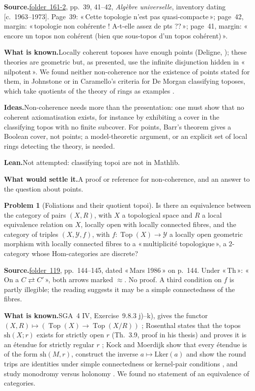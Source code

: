 \documentclass[11pt]{article}
\newcommand{\q}[1]{«\,#1\,»}
\newcommand{\fac}[1]{\href{https://grothendieck.umontpellier.fr/#1.pdf}{folder~#1}}
\newcommand{\Top}{\operatorname{Top}}
\theoremstyle{definition}
\newtheorem{problem}{Problem}
\theoremstyle{plain}\newtheorem*{proposition}{Proposition}\theoremstyle{definition}
\newcommand{\entry}[1]{\par\medskip\noindent\textbf{#1}\enspace}
\newcommand{\src}[1]{\entry{Source.}#1}
\newcommand{\known}{\entry{What is known.}}
\newcommand{\ideas}{\entry{Ideas.}}
\newcommand{\leanst}{\entry{Lean.}}
\newcommand{\settle}{\entry{What would settle it.}}
\begin{document}
\src{\fac{161-2}, pp.~39, 41--42, \emph{Algèbre universelle}, inventory dating [c.~1963--1973]. Page~39: \q{Cette topologie n'est pas quasi-compacte}; page~42, margin: \q{topologie non cohérente ! A-t-elle assez de pts ??}; page~41, margin: \q{encore un topos non cohérent (bien que sous-topos d'un topos cohérent)}.}

\known Locally coherent toposes have enough points (Deligne, \cite[VI, 9.0]{sga4}); these theories are geometric but, as presented, use the infinite disjunction hidden in \q{nilpotent}. We found neither non-coherence nor the existence of points stated for them, in Johnstone \cite{elephant} or in Caramello's criteria for De Morgan classifying toposes, which take quotients of the theory of rings as examples \cite[\S5]{caramello}.

\ideas Non-coherence needs more than the presentation: one must show that no coherent axiomatisation exists, for instance by exhibiting a cover in the classifying topos with no finite subcover. For points, Barr's theorem gives a Boolean cover, not points; a model-theoretic argument, or an explicit set of local rings detecting the theory, is needed.

\leanst Not attempted: classifying topoi are not in Mathlib.

\settle A proof or reference for non-coherence, and an answer to the question about points.

\begin{problem}[Foliations and their quotient topoi]\label{p:fol}
Is there an equivalence between the category of pairs $(X, R)$, with $X$ a topological space and $R$ a local equivalence relation on $X$, locally open with locally connected fibres, and the category of triples $(X, \mathcal Y, f)$, with $f : \Top(X) \to \mathcal Y$ a locally open geometric morphism with locally connected fibres to a \q{multiplicité topologique}, a $2$-category whose Hom-categories are discrete?
\end{problem}

\src{\fac{119}, pp.~144--145, dated \q{Mars 1986} on p.~144. Under \q{Th}: \q{On a $C \rightleftarrows C'$}, both arrows marked $\approx$. No proof. A third condition on $f$ is partly illegible; the reading suggests it may be a simple connectedness of the fibres.}

\known SGA~4 IV, Exercise~9.8.3 j)--k), gives the functor $(X, R) \mapsto (\Top(X) \to \Top(X/R))$ \cite{sga4}; Rosenthal states that the topos $\mathrm{sh}(X; r)$ exists for strictly open $r$ (Th.~3.9, proof in his thesis) and proves it is an étendue for strictly regular $r$ \cite{rosenthal}; Kock and Moerdijk show that every étendue is of the form $\mathrm{sh}(M, r)$, construct the inverse $a \mapsto \mathrm{Lker}(a)$ and show the round trips are identities under simple connectedness or kernel-pair conditions \cite{kockmoerdijk1992}, and study monodromy versus holonomy \cite{kockmoerdijk1996}. We found no statement of an equivalence of categories.
\end{document}
